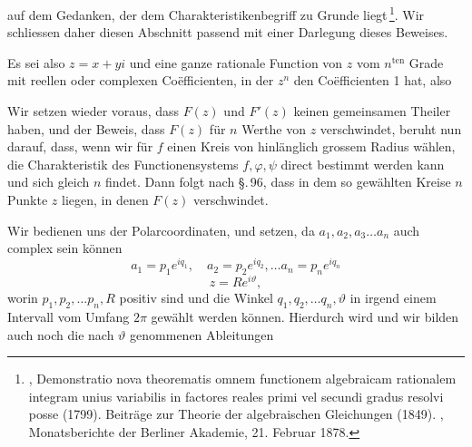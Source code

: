 auf dem Gedanken, der dem Charakteristikenbegriff zu Grunde
liegt\,\footnote{, Demonstratio nova theorematis omnem functionem algebraicam rationalem integram unius variabilis in factores reales primi vel
secundi gradus resolvi posse (1799). Beiträge zur Theorie der algebraischen
Gleichungen (1849). , Monatsberichte der Berliner Akademie,
21. Februar 1878.}. Wir schliessen daher diesen Abschnitt passend mit einer
Darlegung dieses Beweises.

Es sei also $z = x + yi$ und
eine ganze rationale Function von $z$ vom $n^{\text{ten}}$ Grade mit reellen
oder complexen Coëfficienten, in der $z^n$ den Coëfficienten 1 hat,
also

Wir setzen wieder voraus, dass $F(z)$ und $F'(z)$ keinen gemeinsamen Theiler haben, und der Beweis, dass $F(z)$ für $n$
Werthe von $z$ verschwindet, beruht nun darauf, dass, wenn wir
für $f$ einen Kreis von hinlänglich grossem Radius wählen, die
Charakteristik des Functionensystems $f, \varphi, \psi$ direct bestimmt
werden kann und sich gleich $n$ findet. Dann folgt nach \S.\,96,
dass in dem so gewählten Kreise $n$ Punkte $z$ liegen, in denen
$F(z)$ verschwindet.

Wir bedienen uns der Polarcoordinaten, und setzen, da
$a_1, a_2, a_3 \dots a_n$ auch complex sein können
\[
a_1 = p_1 e^{iq_1},\quad a_2 = p_2 e^{iq_2}, \dots a_n = p_n e^{iq_n}
\]
\[
z = R e^{i\vartheta},
\]
worin $p_1, p_2, \dots p_n, R$ positiv sind und die Winkel $q_1, q_2, \dots q_n, \vartheta$
in irgend einem Intervall vom Umfang $2\pi$ gewählt werden können.
Hierdurch wird
und wir bilden auch noch die nach $\vartheta$ genommenen Ableitungen
